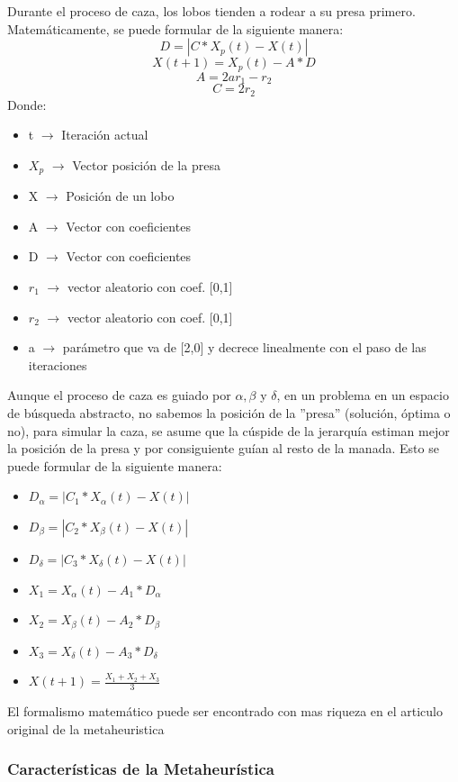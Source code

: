 \documentclass[a4paper]{report}
\begin{document}
Durante el proceso de caza, los lobos tienden a rodear a su presa primero. Matemáticamente, se puede formular de la siguiente manera:
$$D=|C*X_p(t)-X(t)| $$
$$X(t+1)=X_p(t)-A*D$$
$$A=2ar_1-r_2$$
$$C=2r_2$$
Donde:
\begin{itemize}
    \item t $\rightarrow$ Iteración actual
    \item $X_p$ $\rightarrow$ Vector posición de la presa
    \item X $\rightarrow$ Posición de un lobo
    \item A $\rightarrow$ Vector con coeficientes
    \item D $\rightarrow$ Vector con coeficientes
    \item $r_1$ $\rightarrow$ vector aleatorio con coef. [0,1]
    \item $r_2$ $\rightarrow$ vector aleatorio con coef. [0,1]
    \item a $\rightarrow$ parámetro que va de [2,0] y decrece linealmente con el paso de las iteraciones
\end{itemize}


Aunque el proceso de caza es guiado por $\alpha,\beta$ y $\delta$, en un problema en un espacio de búsqueda abstracto, no sabemos la posición de la ''presa'' (solución, óptima o no), para simular la caza, se asume que la cúspide de la jerarquía estiman mejor la posición de la presa y por consiguiente guían al resto de la manada. Esto se puede formular de la siguiente manera:


\begin{itemize}
    \item $D_\alpha=|C_1*X_\alpha(t)-X(t)| $
    \item $D_\beta=|C_2*X_\beta(t)-X(t)| $
    \item $D_\delta=|C_3*X_\delta(t)-X(t)| $
    \item $X_1=X_\alpha(t)-A_1*D_\alpha$
    \item $X_2=X_\beta(t)-A_2*D_\beta$
    \item $X_3=X_\delta(t)-A_3*D_\delta$
    \item $X(t+1)=\frac{X_1+X_2+X_3}{3}$
\end{itemize}

El formalismo matemático puede ser encontrado con mas riqueza en el articulo original de la metaheuristica  \cite{MIRJALILI201446}

\subsubsection{Características de la Metaheurística}
\end{document}
